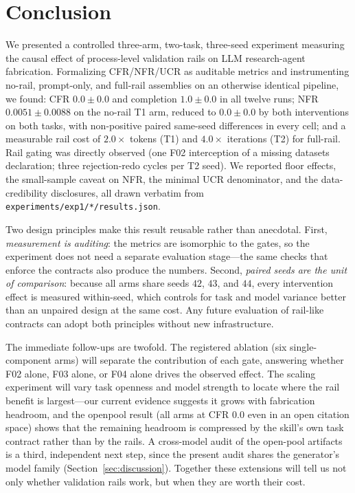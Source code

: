 \documentclass[10pt,twocolumn]{article}
\begin{document}
\section{Conclusion}
\label{sec:conclusion}

We presented a controlled three-arm, two-task, three-seed experiment measuring the causal effect of process-level validation rails on LLM research-agent fabrication. Formalizing CFR/NFR/UCR as auditable metrics and instrumenting no-rail, prompt-only, and full-rail assemblies on an otherwise identical pipeline, we found: CFR $0.0 \pm 0.0$ and completion $1.0 \pm 0.0$ in all twelve runs; NFR $0.0051 \pm 0.0088$ on the no-rail T1 arm, reduced to $0.0 \pm 0.0$ by both interventions on both tasks, with non-positive paired same-seed differences in every cell; and a measurable rail cost of $2.0\times$ tokens (T1) and $4.0\times$ iterations (T2) for full-rail. Rail gating was directly observed (one F02 interception of a missing datasets declaration; three rejection-redo cycles per T2 seed). We reported floor effects, the small-sample caveat on NFR, the minimal UCR denominator, and the data-credibility disclosures, all drawn verbatim from \texttt{experiments/exp1/*/results.json}.

Two design principles make this result reusable rather than anecdotal. First, \emph{measurement is auditing}: the metrics are isomorphic to the gates, so the experiment does not need a separate evaluation stage---the same checks that enforce the contracts also produce the numbers. Second, \emph{paired seeds are the unit of comparison}: because all arms share seeds $42$, $43$, and $44$, every intervention effect is measured within-seed, which controls for task and model variance better than an unpaired design at the same cost. Any future evaluation of rail-like contracts can adopt both principles without new infrastructure.

The immediate follow-ups are twofold. The registered ablation (six single-component arms) will separate the contribution of each gate, answering whether F02 alone, F03 alone, or F04 alone drives the observed effect. The scaling experiment will vary task openness and model strength to locate where the rail benefit is largest---our current evidence suggests it grows with fabrication headroom, and the openpool result (all arms at CFR $0.0$ even in an open citation space) shows that the remaining headroom is compressed by the skill's own task contract rather than by the rails. A cross-model audit of the open-pool artifacts is a third, independent next step, since the present audit shares the generator's model family (Section~\ref{sec:discussion}). Together these extensions will tell us not only whether validation rails work, but when they are worth their cost.



\end{document}
